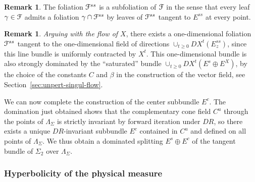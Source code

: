 \documentclass[reqno,12pt,a4paper]{amsart}
\theoremstyle{plain}
\theoremstyle{definition}
\newtheorem{remark}[theorem]{Remark}
\begin{document}
\begin{remark}
  \label{rmk:subfoliation}
  The foliation ${\EuScript{F}}^{ss}$ is a subfoliation of
  ${\EuScript{F}}$ in the sense that every leaf
  $\gamma\in{\EuScript{F}}$ admits a foliation
  $\gamma\cap{\EuScript{F}}^{ss}$ by leaves of ${\EuScript{F}}^{ss}$ tangent to
  $E^{ss}$ at every point.
\end{remark}

\begin{remark}
\label{rmk:1dfoliation}
\emph{Arguing with the flow of $X$}, there exists a
one-dimensional foliation ${\EuScript{F}}^{ss}$ tangent to the
one-dimensional field of directions
$\cup_{t\ge0}DX^t(E^{ss}_z)$, since this line bundle is
uniformly contracted by $X^t$.  This one-dimensional bundle
is also strongly dominated by the ``saturated'' bundle
$\cup_{t\ge0}DX^t(E^{s}\oplus E^X)$, by the choice of the
constants $C$ and $\beta$ in the construction of the vector
field, see Section~\ref{sec:unpert-singul-flow}.
\end{remark}

We can now complete the construction of the center subbundle
$E^c$. The domination just obtained shows that the
complementary cone field $C^u$ through the points of
$\Lambda_\Sigma$ is strictly invariant by forward iteration
under $DR$, so there exists a unique $DR$-invariant
subbundle $E^c$ contained in $C^u$ and defined on all points
of $\Lambda_\Sigma$. We thus obtain a dominated splitting
$E^s\oplus E^c$ of the tangent bundle of $\Sigma_2$ over
$\Lambda_\Sigma$.

\subsubsection{Hyperbolicity of the physical measure}
\label{sec:hyperb-physic-measur}
\end{document}
